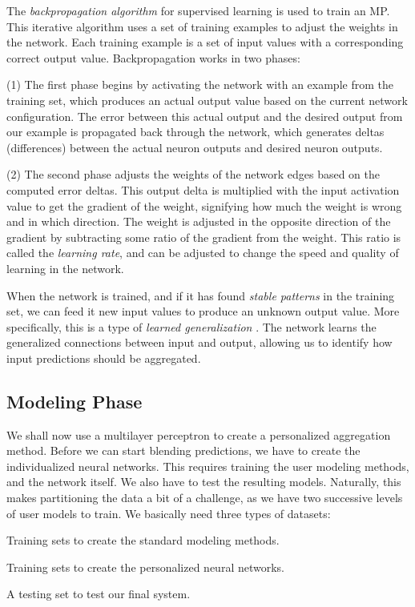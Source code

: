The \emph{backpropagation algorithm} for supervised learning \cite[p578]{Russell1995}
is used to train an MP.
This iterative algorithm uses a set of training examples to adjust the weights in 
the network. Each training example is a set of input values with a corresponding correct output value.
Backpropagation works in two phases:

(1) The first phase begins by activating the network with an example from the training set,
which produces an actual output value based on the current network configuration.
The error between this actual output and the desired output from our example
is propagated back through the network, which generates deltas (differences)
between the actual neuron outputs and desired neuron outputs.

(2) The second phase adjusts the weights of the network edges based on the computed error deltas.
This output delta is multiplied with the input activation value to get the gradient of the weight,
signifying how much the weight is wrong and in which direction.
The weight is adjusted in the opposite direction of the gradient by subtracting some ratio
of the gradient from the weight. 
This ratio is called the \emph{learning rate},
and can be adjusted to change the speed and quality of learning in the network.

When the network is trained, and if it has found \emph{stable patterns} in the training set,
we can feed it new input values to produce an unknown output value.
More specifically, this is a type of \emph{learned generalization} \cite[p177]{Floreano2008}.
The network learns the generalized connections between input and output,
allowing us to identify how input predictions should be aggregated.


\subsection{Modeling Phase}

We shall now use a multilayer perceptron to create a personalized aggregation method.
Before we can start blending predictions, we have to create the individualized neural networks.
This requires training the user modeling methods, and the network itself.
We also have to test the resulting models.
Naturally, this makes partitioning the data a bit of a challenge, as we have two successive levels of user models to train.
We basically need three types of datasets: 

\begin{enumerate*}
  \item Training sets to create the standard modeling methods.
  \item Training sets to create the personalized neural networks.
  \item A testing set to test our final system.
\end{enumerate*}

